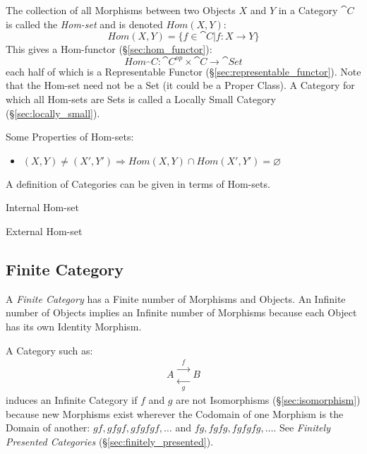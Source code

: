 The collection of all Morphisms between two Objects $X$ and $Y$ in a
Category $\cat{C}$ is called the \emph{Hom-set} and is denoted
$Hom(X,Y)$:
\[
  Hom(X,Y) = \{f \in \cat{C} | f : X \rightarrow Y\}
\]
This gives a Hom-functor (\S\ref{sec:hom_functor}):
\[
  Hom_\cat{C} : \cat{C^{op}} \times \cat{C} \rightarrow \cat{Set}
\]
each half of which is a Representable Functor
(\S\ref{sec:representable_functor}).
\newline
\fist Note that the Hom-set need not be a Set (it could be a
Proper Class). A Category for which all Hom-sets are Sets is called a
Locally Small Category (\S\ref{sec:locally_small}).

Some Properties of Hom-sets:
\begin{itemize}
\item $ (X,Y) \neq (X',Y') \Rightarrow
  Hom(X,Y) \cap Hom(X',Y') = \varnothing$
\end{itemize}

A definition of Categories can be given in terms of Hom-sets. %

Internal Hom-set

External Hom-set



\subsection{Finite Category}\label{sec:finite_category}

A \emph{Finite Category} has a Finite number of Morphisms and Objects.
An Infinite number of Objects implies an Infinite number of Morphisms
because each Object has its own Identity Morphism.

A Category such as:
\[
  A
  \begin{matrix}
  \xrightarrow{\;\;f\;\;}\\
  \xleftarrow[\;\;g\;\;]{}
  \end{matrix}
  B
\]
induces an Infinite Category if $f$ and $g$ are not Isomorphisms
(\S\ref{sec:isomorphism}) because new Morphisms exist wherever the
Codomain of one Morphism is the Domain of another: $gf, gfgf, gfgfgf,
\ldots$ and $fg, fgfg, fgfgfg, \ldots$. See \emph{Finitely Presented
  Categories} (\S\ref{sec:finitely_presented}).

